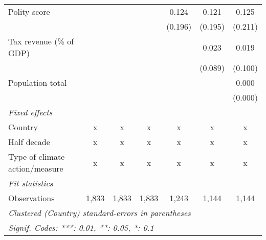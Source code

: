 \begin{tabular}{lcccccc}
   Polity score                                                &               &               &               & 0.124          & 0.121          & 0.125\\   
                                                               &               &               &               & (0.196)        & (0.195)        & (0.211)\\   
   Tax revenue (\% of GDP)                                     &               &               &               &                & 0.023          & 0.019\\   
                                                               &               &               &               &                & (0.089)        & (0.100)\\   
   Population total                                            &               &               &               &                &                & 0.000\\   
                                                               &               &               &               &                &                & (0.000)\\   
   \emph{Fixed effects}\\
   Country                                                     & x             & x             & x             & x              & x              & x\\  
   Half decade                                                 & x             & x             & x             & x              & x              & x\\  
   Type of climate action/measure                              & x             & x             & x             & x              & x              & x\\  
   \midrule \emph{Fit statistics}\\
   Observations                                                & 1,833         & 1,833         & 1,833         & 1,243          & 1,144          & 1,144\\  
   \midrule
   \multicolumn{7}{l}{\emph{Clustered (Country) standard-errors in parentheses}}\\
   \multicolumn{7}{l}{\emph{Signif. Codes: ***: 0.01, **: 0.05, *: 0.1}}\\
\end{tabular}
\par\endgroup


